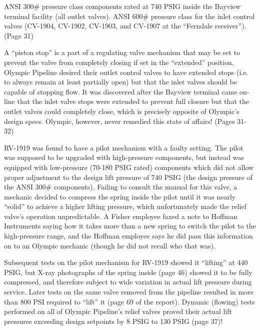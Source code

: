 












ANSI 300\# pressure class components rated at 740 PSIG inside the Bayview terminal facility (all outlet valves).  ANSI 600\# pressure class for the inlet control valves (CV-1904, CV-1902, CV-1903, and CV-1907 at the ``Ferndale receiver'').  (Page 31)

A ``piston stop'' is a part of a regulating valve mechanism that may be set to prevent the valve from completely closing if set in the ``extended'' position.  Olympic Pipeline desired their outlet control valves to have extended stops (i.e. to always remain at least partially open) but that the inlet valves should be capable of stopping flow.  It was discovered after the Bayview terminal came on-line that the inlet valve stops were extended to prevent full closure but that the outlet valves could completely close, which is precisely opposite of Olympic's design specs.  Olympic, however, never remedied this state of affairs!  (Pages 31-32)

\vskip 10pt

RV-1919 was found to have a pilot mechanism with a faulty setting.  The pilot was supposed to be upgraded with high-pressure components, but instead was equipped with low-pressure (70-180 PSIG rated) components which did not allow proper adjustment to the design lift pressure of 740 PSIG (the design pressure of the ANSI 300\# components).  Failing to consult the manual for this valve, a mechanic decided to compress the spring inside the pilot until it was nearly ``solid'' to achieve a higher lifting pressure, which unfortunately made the relief valve's operation unpredictable.  A Fisher employee faxed a note to Hoffman Instruments saying how it takes more than a new spring to switch the pilot to the high-pressure range, and the Hoffman employee says he did pass this information on to an Olympic mechanic (though he did not recall who that was).

Subsequent tests on the pilot mechanism for RV-1919 showed it ``lifting'' at 440 PSIG, but X-ray photographs of the spring inside (page 46) showed it to be fully compressed, and therefore subject to wide variation in actual lift pressure during service.  Later tests on the same valve removed from the pipeline resulted in more than 800 PSI required to ``lift'' it (page 69 of the report).  Dynamic (flowing) tests performed on all of Olympic Pipeline's relief valves proved their actual lift pressures exceeding design setpoints by 8 PSIG to 130 PSIG (page 37)!


